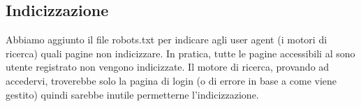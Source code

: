 \documentclass[1_relazione.tex]{subfiles}
\begin{document}
\subsection{Indicizzazione}
Abbiamo aggiunto il file robots.txt per indicare agli user agent (i motori di ricerca) quali pagine non indicizzare. In pratica, tutte le pagine accessibili al sono utente registrato non vengono indicizzate. Il motore di ricerca, provando ad accedervi, troverebbe solo la pagina di login (o di errore in base a come viene gestito) quindi sarebbe inutile permetterne l'indicizzazione.
\end{document}
